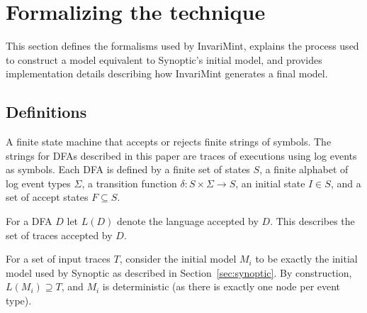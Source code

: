 \section{Formalizing the technique}
\label{sec:formalizing}

This section defines the formalisms used by InvariMint, explains the process
used to construct a model equivalent to Synoptic's initial model, and provides
implementation details describing how InvariMint generates a final
model.


\subsection{Definitions}
\label{sec:Definitions}
\begin{definition} 
A finite state machine that accepts or rejects finite strings of symbols. The
strings for DFAs described in this paper are traces of executions using log
events as symbols. Each DFA is defined by a finite set of states $S$, a finite
alphabet of log event types $\Sigma$, a transition function $\delta : S \times
\Sigma \rightarrow S$, an initial state $I \in S$, and a set of accept states
$F \subseteq S$.
\end{definition}

\begin{definition}
For a DFA $D$ let $L(D)$ denote the language accepted 
by $D$. This describes the set of traces accepted by $D$. 
\end{definition}

\begin{definition}
For a set of input traces $T$, consider the initial model
$M_i$ to be exactly the initial model used by Synoptic as described in
Section~\ref{sec:synoptic}. By
construction, $L(M_i) \supseteq T$, and $M_i$ is deterministic (as
there is exactly one node per event type). 
\end{definition}

